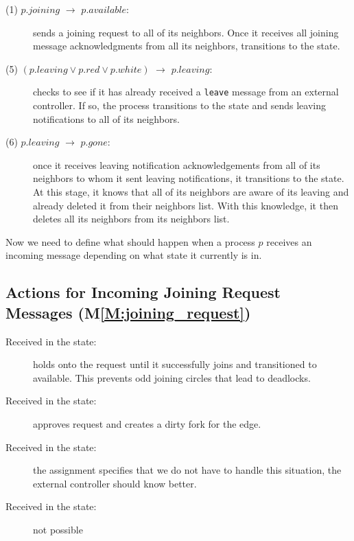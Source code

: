 \documentclass[11pt]{article}
\begin{document}
\begin{description}
\item[(1) $p.joining$ $\to$ $p.available$:] sends a joining request to all of its neighbors. Once it receives all joining message acknowledgments from all its neighbors, transitions to the \available state.

\item[(5) $(p.leaving \vee p.red \vee p.white)$ $\to$ $p.leaving$:] checks to see if it has already received a \texttt{leave} message from an external controller. If so, the process transitions to the \leaving state and sends leaving notifications to all of its neighbors. 

\item[(6) $p.leaving$ $\to$ $p.gone$:]
once it receives leaving notification acknowledgements from all of its neighbors to whom it sent leaving notifications, it transitions to the \gone state. At this stage, it knows that all of its neighbors are aware of its leaving and already deleted it from their neighbors list. With this knowledge, it then deletes all its neighbors from its neighbors list.
\end{description}

Now we need to define what should happen when a process $p$ receives an incoming message depending on what state it currently is in.

\subsection{Actions for Incoming Joining Request Messages (M\ref{M:joining_request})}
\begin{description}
\item[Received in the \joining state:] holds onto the request until it successfully joins and transitioned to available. This prevents odd joining circles that lead to deadlocks.
\item[Received in the \available state:] approves request and creates a dirty fork for the edge.
\item[Received in the \leaving state:] the assignment specifies that we do not have to handle this situation, the external controller should know better.
\item[Received in the \gone state:] not possible
\end{description}
\end{document}
